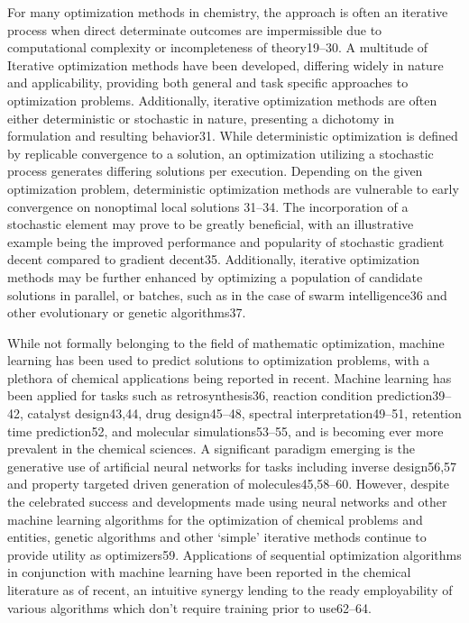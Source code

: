 For many optimization methods in chemistry, the approach is often an iterative process when direct determinate outcomes are impermissible due to computational complexity or incompleteness of theory19–30.  A multitude of Iterative optimization methods have been developed, differing widely in nature and applicability, providing both general and task specific   approaches to optimization problems.   Additionally, iterative optimization methods are often either deterministic or stochastic in nature, presenting a dichotomy in formulation and resulting behavior31.  While deterministic optimization is defined by replicable convergence to a solution, an optimization utilizing a stochastic process generates differing solutions per execution.  Depending on the given optimization problem, deterministic optimization methods are vulnerable to early convergence on nonoptimal local solutions 31–34.  The incorporation of a stochastic element may prove to be greatly beneficial, with an illustrative example being the improved performance and popularity of stochastic gradient decent compared to gradient decent35.  Additionally, iterative optimization methods may be further enhanced by optimizing a population of candidate solutions in parallel, or batches, such as in the case of swarm intelligence36 and other evolutionary or genetic algorithms37.

While not formally belonging to the field of mathematic optimization, machine learning has been used to predict solutions to optimization problems, with a plethora of chemical applications being reported in recent.  Machine learning has been applied for tasks such as retrosynthesis36, reaction condition prediction39–42, catalyst design43,44, drug design45–48, spectral interpretation49–51, retention time prediction52, and molecular simulations53–55, and is becoming ever more prevalent in the chemical sciences.  A significant paradigm emerging is the generative use of artificial neural networks for tasks including inverse design56,57 and property targeted driven generation of molecules45,58–60.  However, despite the celebrated success and developments made using neural networks and other machine learning algorithms for the optimization of chemical problems and entities, genetic algorithms and other ‘simple’ iterative methods continue to provide utility as optimizers59.  Applications of sequential optimization algorithms in conjunction with machine learning have been reported in the chemical literature as of recent, an intuitive synergy lending to the ready employability of various algorithms which don’t require training prior to use62–64.  

